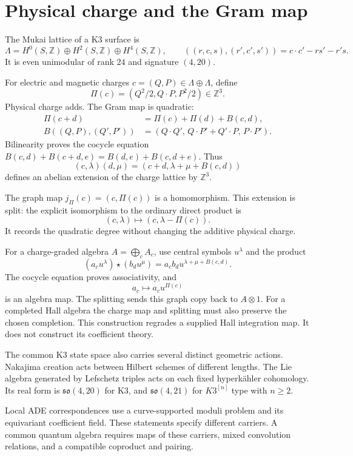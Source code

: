 \section{Physical charge and the Gram map}

The Mukai lattice of a K3 surface is
\[
 \Lambda=H^0(S,\mathbb Z)\oplus H^2(S,\mathbb Z)
                         \oplus H^4(S,\mathbb Z),\qquad
 ((r,c,s),(r',c',s'))=c\cdot c'-rs'-r's.
\]
It is even unimodular of rank \(24\) and signature \((4,20)\).

For electric and magnetic charges \(c=(Q,P)\in\Lambda\oplus\Lambda\),
define
\[
 \Pi(c)=\left(Q^2/2,Q\cdot P,P^2/2\right)\in\mathbb Z^3.
\]
Physical charge adds. The Gram map is quadratic:
\[
\begin{aligned}
 \Pi(c+d)&=\Pi(c)+\Pi(d)+B(c,d),\\
 B((Q,P),(Q',P'))&=
       (Q\cdot Q',\,Q\cdot P'+Q'\cdot P,\,P\cdot P').
\end{aligned}
\]
Bilinearity proves the cocycle equation
\(B(c,d)+B(c+d,e)=B(d,e)+B(c,d+e)\).
Thus
\[
 (c,\lambda)(d,\mu)
     =(c+d,\lambda+\mu+B(c,d))
\]
defines an abelian extension of the charge lattice by
\(\mathbb Z^3\).

The graph map \(j_\Pi(c)=(c,\Pi(c))\) is a homomorphism.
This extension is split: the explicit isomorphism to the
ordinary direct product is
\[
 (c,\lambda)\longmapsto(c,\lambda-\Pi(c)).
\]
It records the quadratic degree without changing the
additive physical charge.

For a charge-graded algebra \(A=\bigoplus_cA_c\), use
central symbols \(u^\lambda\) and the product
\[
 (a_cu^\lambda)\star(b_du^\mu)
       =a_cb_du^{\lambda+\mu+B(c,d)}.
\]
The cocycle equation proves associativity, and
\[
 a_c\longmapsto a_cu^{\Pi(c)}
\]
is an algebra map. The splitting sends this graph copy
back to \(A\otimes1\).
For a completed Hall algebra the charge map and splitting
must also preserve the chosen completion.
This construction regrades a supplied Hall integration
map. It does not construct its coefficient theory.

The common K3 state space also carries several distinct
geometric actions. Nakajima creation acts between Hilbert
schemes of different lengths.
The Lie algebra generated by Lefschetz triples acts on
each fixed hyperk\"ahler cohomology.
Its real form is \(\mathfrak{so}(4,20)\) for K3, and
\(\mathfrak{so}(4,21)\) for \(K3^{[n]}\) type with \(n\geq2\).

Local ADE correspondences use a curve-supported moduli
problem and its equivariant coefficient field.
These statements specify different carriers.
A common quantum algebra requires maps of these carriers,
mixed convolution relations, and a compatible coproduct
and pairing.

